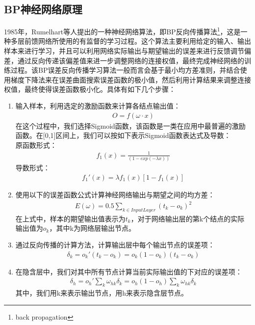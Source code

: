 \subsection{BP神经网络原理}
1985年，Rumelhart等人提出的一种神经网络算法，即BP反向传播算法\footnote{back propagation}，这是一种多层前馈网络所使用的有监督的学习过程。这个算法主要利用给定的输入、输出样本来进行学习，并且可以利用网络实际输出与期望输出的误差来进行反馈调节偏差，通过反向传递该偏差值来进一步调整网络的连接权值，最终完成神经网络的训练过程。该BP误差反向传播学习算法一般而言会基于最小均方差准则，并结合使用梯度下降法来在误差曲面搜索误差函数的极小值，然后利用计算结果来调整连接权值，最终使得误差函数极小化\supercite{65}。具体有如下几个步骤：
\begin{enumerate}[noitemsep,topsep=0pt,parsep=0pt,partopsep=0pt]
	\item 输入样本，利用选定的激励函数来计算各结点输出值：
	 	\begin{align}
	 		O = f(\omega \cdot x)
	 	\end{align}
	 	在这个过程中，我们选择Sigmoid函数，该函数是一类在应用中最普遍的激励函数。在[0,1]区间上，我们可以按如下表示Sigmoid函数表达式及导数：\\
	 	原函数形式：
	 	\begin{align}
	 		f_{1}(x) = \frac{1}{(1 - exp(-\lambda x))}
	 	\end{align}
	 	导数形式：
		\begin{align}
	 		f_{1}'(x) = \lambda f_{1}(x)[1-f_{1}(x)]
	 	\end{align}
	 \item 使用以下的误差函数公式计算神经网络输出与期望之间的均方差：
	 	\begin{align}
	 		E(\omega) = 0.5\sum_{k\in Input Layer}(t_{k} - o_{k})^{2}
	 	\end{align}
	 	在上式中，样本的期望输出值表示为$t_{k}$，对于网络输出层的第k个结点的实际输出值为$o_{k}$，其中k为网络层输出节点。
	 \item 通过反向传播的计算方法，计算输出层中每个输出节点的误差项：
	 	\begin{align}
	 		\delta_{k} = o_{k}'(t_{k} - o_{k}) = o_{k}(1 - o_{k})(t_{k} - o_{k})
	 	\end{align}
	 \item 在隐含层中，我们对其中所有节点计算当前实际输出值的下对应的误差项：
	 	\begin{align}
	 		\delta_{h} = o_{h}'\sum_{k}\omega_{hk}\delta_{k} = o_{h}(1 - o_{h})\sum_{k}\omega_{hk}\delta_{k}
	 	\end{align}
	 	其中，我们用k来表示输出节点，用h来表示隐含层节点。

\end{enumerate}
